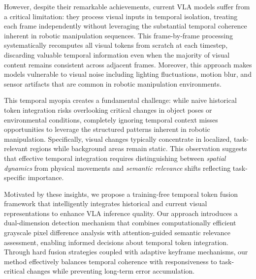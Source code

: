 \documentclass[letterpaper]{article}
\begin{document}
However, despite their remarkable achievements, current VLA models suffer from a critical limitation: they process visual inputs in temporal isolation, treating each frame independently without leveraging the substantial temporal coherence inherent in robotic manipulation sequences. This frame-by-frame processing systematically recomputes all visual tokens from scratch at each timestep, discarding valuable temporal information even when the majority of visual content remains consistent across adjacent frames. Moreover, this approach makes models vulnerable to visual noise including lighting fluctuations, motion blur, and sensor artifacts that are common in robotic manipulation environments.

This temporal myopia creates a fundamental challenge: while naive historical token integration risks overlooking critical changes in object poses or environmental conditions, completely ignoring temporal context misses opportunities to leverage the structured patterns inherent in robotic manipulation. Specifically, visual changes typically concentrate in localized, task-relevant regions while background areas remain static. This observation suggests that effective temporal integration requires distinguishing between \textit{spatial dynamics} from physical movements and \textit{semantic relevance} shifts reflecting task-specific importance.

Motivated by these insights, we propose a training-free temporal token fusion framework that intelligently integrates historical and current visual representations to enhance VLA inference quality. Our approach introduces a dual-dimension detection mechanism that combines computationally efficient grayscale pixel difference analysis with attention-guided semantic relevance assessment, enabling informed decisions about temporal token integration. Through hard fusion strategies coupled with adaptive keyframe mechanisms, our method effectively balances temporal coherence with responsiveness to task-critical changes while preventing long-term error accumulation.
\end{document}
